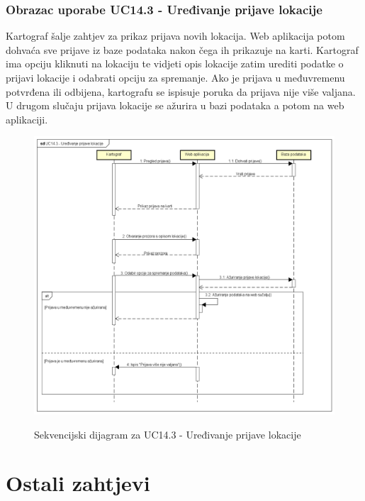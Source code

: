 				\subsubsection{Obrazac uporabe UC14.3 - Uređivanje prijave lokacije}
					\textnormal{Kartograf šalje zahtjev za prikaz prijava novih lokacija. Web aplikacija potom dohvaća sve prijave iz baze podataka
						nakon čega ih prikazuje na karti. Kartograf ima opciju kliknuti na lokaciju te vidjeti opis lokacije zatim urediti
						podatke o prijavi lokacije i odabrati opciju za spremanje. Ako je prijava u međuvremenu potvrđena ili odbijena, kartografu se ispisuje
						poruka da prijava nije više valjana. U drugom slučaju prijava lokacije se ažurira u bazi podataka a potom na web aplikaciji.}\\
				\begin{figure}[H]
					\centering
					\includegraphics[scale=0.47]{dijagrami/UC14.3_sekvencijski} \\
					\caption{ Sekvencijski dijagram za UC14.3 - Uređivanje prijave lokacije}
					\label{fig:UC14.3_sekvencijski}
				\end{figure}

	
		\section{Ostali zahtjevi}
			 
